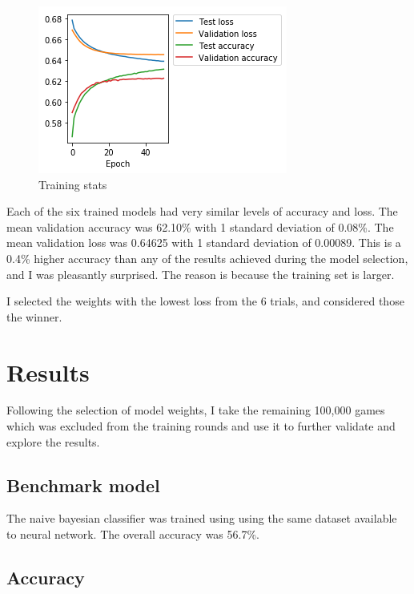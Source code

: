 \documentclass[twoside,twocolumn]{article}
\begin{document}
\begin{figure}[h]
\caption{Training stats}
\label{figure:training}
\includegraphics[width=\linewidth]{training}
\centering
\end{figure}

Each of the six trained models had very similar levels of accuracy and loss.  The mean validation accuracy was 62.10\% with 1 standard deviation of 0.08\%.  The mean validation loss was  0.64625 with 1 standard deviation of 0.00089.  This is a 0.4\% higher accuracy than any of the results achieved during the model selection, and I was pleasantly surprised.  The reason is because the training set is larger.

I selected the weights with the lowest loss from the 6 trials, and considered those the winner.

\section {Results}

Following the selection of model weights, I take the remaining 100,000 games which was excluded from the training rounds and use it to further validate and explore the results.  

\subsection {Benchmark model}

The naive bayesian classifier was trained using  using the same dataset available to neural network.  The overall accuracy was 56.7\%.

\subsection {Accuracy}
\end{document}
